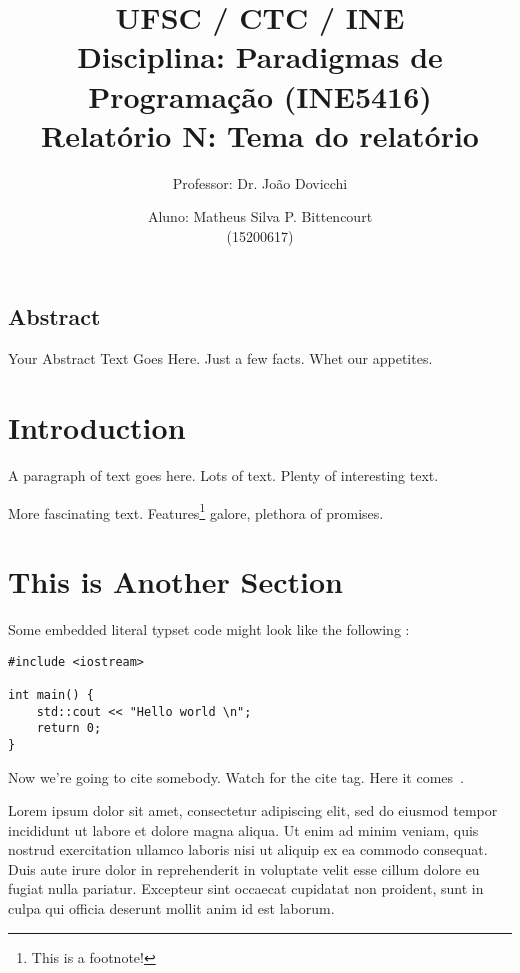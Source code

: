 \documentclass[letterpaper,twocolumn,10pt]{article}
\begin{document}
\title{
    \large \rm UFSC / CTC / INE\\
    \large \rm Disciplina: Paradigmas de Programação (INE5416)\\
    \Large \bf Relatório N: Tema do relatório
}

\author{
    Professor: Dr. João Dovicchi\\
    \and
    Aluno: Matheus Silva P. Bittencourt\\(15200617)
}

\maketitle

\thispagestyle{empty} %

\subsection*{Abstract}
Your Abstract Text Goes Here.  Just a few facts.  Whet our appetites.

\section{Introduction}

A paragraph of text goes here.  Lots of text.  Plenty of interesting text.

\hbox{}

More fascinating text. Features\footnote{This is a footnote!} galore, plethora
of promises.

\hbox{}

\section{This is Another Section}

Some embedded literal typset code might
look like the following :

\begin{verbatim}
#include <iostream>

int main() {
    std::cout << "Hello world \n";
    return 0;
}

\end{verbatim}

Now we're going to cite somebody.  Watch for the cite tag.
Here it comes~\cite{Einstein}.

Lorem ipsum dolor sit amet, consectetur adipiscing elit, sed do eiusmod tempor
incididunt ut labore et dolore magna aliqua. Ut enim ad minim veniam, quis
nostrud exercitation ullamco laboris nisi ut aliquip ex ea commodo consequat.
Duis aute irure dolor in reprehenderit in voluptate velit esse cillum dolore eu
fugiat nulla pariatur. Excepteur sint occaecat cupidatat non proident, sunt in
culpa qui officia deserunt mollit anim id est laborum.
\end{document}
